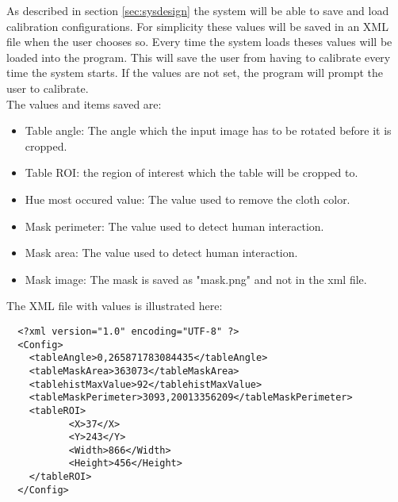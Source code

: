 As described in section \ref{sec:sysdesign} the system will be able to save and load calibration configurations. For simplicity these values will be saved in an XML file when the user chooses so. Every time the system loads theses values will be loaded into the program. This will save the user from having to calibrate every time the system starts. If the values are not set, the program will prompt the user to calibrate.\\

The values and items saved are:
\begin{itemize}
	\item Table angle: The angle which the input image has to be rotated before it is cropped.
	\item Table ROI: the region of interest which the table will be cropped to.
	\item Hue most occured value: The value used to remove the cloth color.
	\item Mask perimeter: The value used to detect human interaction.
	\item Mask area: The value used to detect human interaction.
	\item Mask image: The mask is saved as "mask.png" and not in the xml file.
\end{itemize}

The XML file with values is illustrated here:

\lstset{language=XML}
\begin{lstlisting}
  <?xml version="1.0" encoding="UTF-8" ?> 
  <Config>
  	<tableAngle>0,265871783084435</tableAngle> 
  	<tableMaskArea>363073</tableMaskArea> 
  	<tablehistMaxValue>92</tablehistMaxValue> 
  	<tableMaskPerimeter>3093,20013356209</tableMaskPerimeter> 
  	<tableROI>
		   <X>37</X> 
		   <Y>243</Y> 
		   <Width>866</Width> 
		   <Height>456</Height> 
    </tableROI>
  </Config>
\end{lstlisting}


